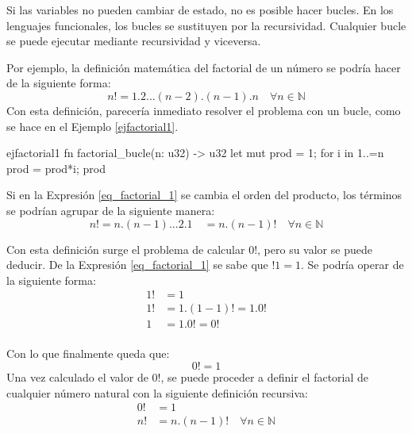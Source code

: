 \documentclass[a4paper,11pt]{extarticle}
\begin{document}
Si las variables no pueden cambiar de estado, no es posible hacer bucles. En los lenguajes funcionales, los bucles se sustituyen por la recursividad. Cualquier bucle se puede ejecutar mediante recursividad y viceversa.

Por ejemplo, la definición matemática del factorial de un número se podría hacer de la siguiente forma:
\begin{equation}
\label{eq_factorial_1}
n! = 1.2...(n-2).(n-1).n \quad \forall n \in \mathds{N} 	
\end{equation}
Con esta definición, parecería inmediato resolver el problema con un bucle, como se hace en el Ejemplo \ref{ejfactorial1}.

\vspace{1em}
\begin{EjemploCodigo}{ejfactorial1}
fn factorial_bucle(n: u32) -> u32 {
   let mut prod = 1;
      for i in 1..=n {
         prod = prod*i;
      }
   prod
}
\end{EjemploCodigo}

Si en la Expresión \ref{eq_factorial_1} se cambia el orden del producto, los términos se podrían agrupar de la siguiente manera:
\begin{equation}
\label{eq_factorial_2}
n! = n.(n-1)...2.1 \quad = n . (n-1)! \quad \forall n \in \mathds{N} 	
\end{equation}

Con esta definición surge el problema de calcular $0!$, pero su valor se puede deducir. De la Expresión \ref{eq_factorial_1} se sabe que $!1 = 1$. Se podría operar de la siguiente forma:
\begin{align*}
1! &= 1 \\
1! &= 1. (1-1)! = 1 . 0! \\
1  &= 1 . 0! = 0! \\
\end{align*}

Con lo que finalmente queda que:
\begin{equation}
\label{eq_factorial_3}
0! = 1
\end{equation}
Una vez calculado el valor de $0!$, se puede proceder a definir el factorial de cualquier número natural con la siguiente definición recursiva:
\begin{align} \label{eq_factorial_4}		
0! &= 1 \nonumber \\
n! &= n . (n-1)! \quad \forall n \in \mathds{N} 
\end{align}
\end{document}
